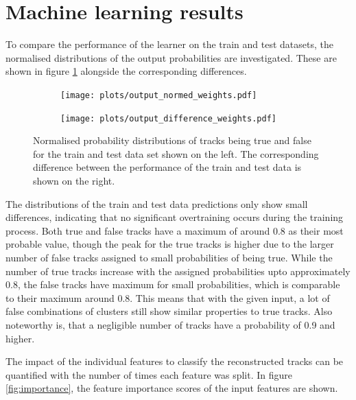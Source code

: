 \section{Machine learning results}
To compare the performance of the learner on the train and test datasets, the normalised distributions of the output probabilities are investigated.
These are shown in figure \ref{fig:output} alongside the corresponding differences.

\begin{figure}
  \hspace{-0.6cm}
  \begin{subfigure}{0.51\textwidth}
      \centering
      \texttt{[image: plots/output\_normed\_weights.pdf]}
  \end{subfigure}
  \begin{subfigure}{0.51\textwidth}
      \texttt{[image: plots/output\_difference\_weights.pdf]}
  \end{subfigure}
  \caption{Normalised probability distributions of tracks being true and false for the train and test data set shown on the left.
  The corresponding difference between the performance of the train and test data is shown on the right.}
  \label{fig:output}
\end{figure}

The distributions of the train and test data predictions only show small differences, indicating that no significant overtraining occurs during the training process.
Both true and false tracks have a maximum of around 0.8 as their most probable value, though the peak for the true tracks is higher due to the larger number
of false tracks assigned to small probabilities of being true. While the number of true tracks increase with the assigned probabilities upto
approximately 0.8, the false tracks have maximum for small probabilities, which is comparable to their maximum around 0.8.
This means that
with the given input, a lot of false combinations of clusters still show similar properties to true tracks.
Also noteworthy is, that a negligible number of tracks have a probability of 0.9 and higher.

The impact of the individual features to classify the reconstructed tracks can be quantified with the number of times each feature was split.
In figure \ref{fig:importance}, the feature importance scores of the input features are shown.

